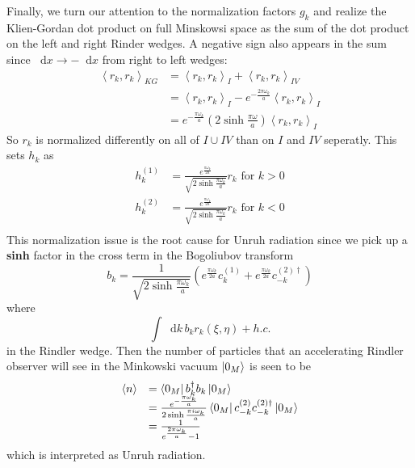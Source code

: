 \documentclass[12pt,a4paper]{article}
\newcommand*\diff{\mathop{}\!\mathrm{d}}
\begin{document}
Finally, we turn our attention to the normalization factors $g_k$ and realize the Klien-Gordan dot product on full Minskowsi space as the sum of the dot product on the left and right Rinder wedges.  A negative sign also appears in the sum since $\diff x \rightarrow -\diff x$ from right to left wedges:
\begin{equation}
 \begin{array}{ll}
  \left< r_k, r_k \right>_{KG} &= \left< r_k, r_k \right>_{I} + \left< r_k, r_k \right>_{IV} \\
  &= \left< r_k, r_k \right>_{I} - e^{- \frac{2\pi \omega_k}{a}} \left< r_k, r_k \right>_{I} \\
  &= e^{-\frac{\pi \omega_k}{a}} (2 \sinh \frac{\pi \omega}{a}) \left< r_k, r_k \right>_{I}
  \end{array}
\end{equation}
So $r_k$ is normalized differently on all of $I \cup IV$ than on $I$ and $IV$ seperatly.  This sets $h_k$ as
\begin{equation}
  \begin{array}{ll}
    h_k^{(1)} &= \frac{e^\frac{\pi \omega_k}{2a}}{\sqrt{2 \sinh \frac{\pi \omega_k}{a}}} r_k \text{ for } k>0\\
    h_k^{(2)} &= \frac{e^\frac{\pi \omega_k}{2a}}{\sqrt{2 \sinh \frac{\pi \omega_k}{a}}} r_k \text{ for } k<0\\
  \end{array}
\end{equation}  
This normalization issue is the root cause for Unruh radiation since we pick up a {\bf sinh} factor in the cross term in the Bogoliubov transform
\begin{equation}
  b_k = \frac{1}{\sqrt{2 \sinh \frac{\pi \omega_k}{a}}} \left( e^\frac{\pi \omega_k}{2a} c_k^{(1)} + e^\frac{\pi \omega_k}{2a} c_{-k}^{(2)\dagger} \right)
\label{bogo}
\end{equation}
where
\begin{equation}
  \int \diff k \, b_k r_k(\xi,\eta) + h.c.
\end{equation}
in the Rindler wedge. Then the number of particles that an accelerating Rindler observer will see in the Minkowski vacuum $\ket{0_M}$ is seen to be 
\begin{equation}
  \label{radeq}
  \begin{array}{ll}
    \braket{n} &= \bra{0_M} b_k^\dagger b_k \ket{0_M} \\
               &= \frac{e^{-\frac{\pi \omega_k}{a}}}{2 \sinh \frac{\pi i \omega_k}{a}}\bra{0_M}  c_{-k}^{(2)} c_{-k}^{(2)\dagger} \ket{0_M} \\
               &= \frac{1}{e^{\frac{2 \pi \omega_k}{a}}-1} \\
  \end{array}
\end{equation}
which is interpreted as Unruh radiation.
\end{document}
